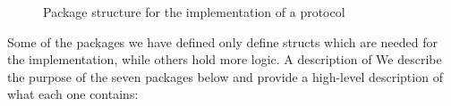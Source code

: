 \documentclass[12pt,twoside]{report}
\begin{document}
\begin{figure}[h!]
    \centering
    \begin{minipage}{5cm}
    \end{minipage}
    \caption{Package structure for the implementation of a protocol}
    \label{project-package-structure}
\end{figure}

Some of the packages we have defined only define structs which are needed for the implementation, while others hold more logic. A description of  We describe the purpose of the seven packages below and provide a high-level description of what each one contains:

\end{document}
